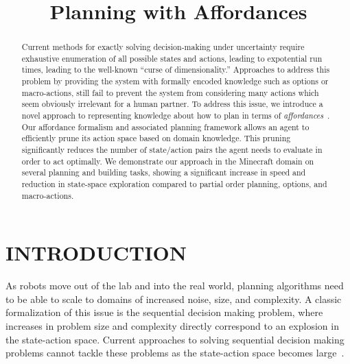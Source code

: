 \documentclass[]{article}
\title{Planning with Affordances}
\begin{document}
\author{}
\maketitle

\begin{abstract}
Current methods for exactly solving decision-making under uncertainty
require exhaustive enumeration of all possible states and actions,
leading to expotential run times, leading to the well-known ``curse of
dimensionality.''  Approaches to address this problem by providing the
system with formally encoded knowledge such as options or
macro-actions, still fail to prevent the system from considering many
actions which seem obviously irrelevant for a human partner.  To
address this issue, we introduce a novel approach to representing
knowledge about how to plan in terms of {\em
  affordances}~\citep{gibson77}.  Our affordance formalism and
associated planning framework allows an agent to efficiently prune its
action space based on domain knowledge.  This pruning significantly
reduces the number of state/action pairs the agent needs to evaluate
in order to act optimally.  We demonstrate our approach in the
Minecraft domain on several planning and building tasks, showing a
significant increase in speed and reduction in state-space exploration
compared to partial order planning, options, and macro-actions.
\end{abstract}

\section{INTRODUCTION}

As robots move out of the lab and into the real world, planning
algorithms need to be able to scale to domains of increased noise,
size, and complexity.  A classic formalization of this issue is the
sequential decision making problem, where increases in problem size
and complexity directly correspond to an explosion in the state-action
space. Current approaches to solving sequential decision making
problems cannot tackle these problems as the state-action space
becomes large~\citep{Grounds2005}.
\end{document}
